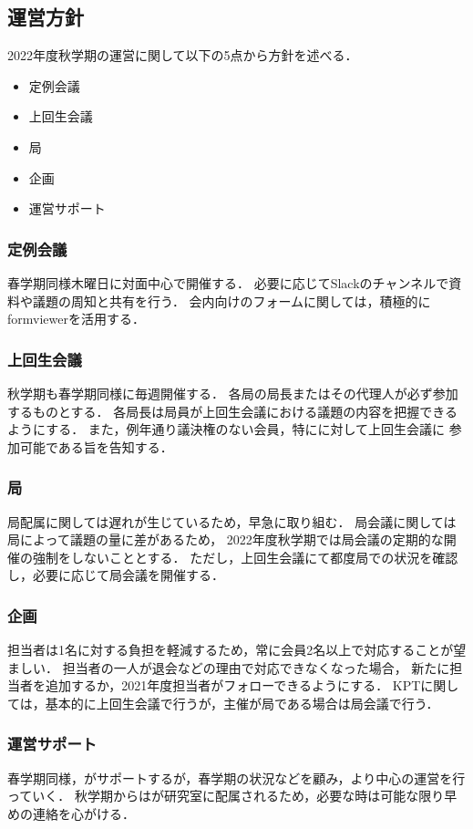 \subsection*{運営方針}


2022年度秋学期の運営に関して以下の5点から方針を述べる．
\begin{itemize}
    \item 定例会議
    \item 上回生会議
    \item 局
    \item 企画
    \item 運営サポート
\end{itemize}

\subsubsection*{定例会議}
春学期同様木曜日に対面中心で開催する．
必要に応じてSlackのチャンネルで資料や議題の周知と共有を行う．
会内向けのフォームに関しては，積極的にformviewerを活用する．

\subsubsection*{上回生会議}
秋学期も春学期同様に毎週開催する．
各局の局長またはその代理人が必ず参加するものとする．
各局長は局員が上回生会議における議題の内容を把握できるようにする．
また，例年通り議決権のない会員，特に\firstGrade{}に対して上回生会議に
参加可能である旨を告知する．

\subsubsection*{局}
局配属に関しては遅れが生じているため，早急に取り組む．
局会議に関しては局によって議題の量に差があるため，
2022年度秋学期では局会議の定期的な開催の強制をしないこととする．
ただし，上回生会議にて都度局での状況を確認し，必要に応じて局会議を開催する．

\subsubsection*{企画}
担当者は1名に対する負担を軽減するため，常に会員2名以上で対応することが望ましい．
担当者の一人が退会などの理由で対応できなくなった場合，
新たに担当者を追加するか，2021年度担当者がフォローできるようにする．
KPTに関しては，基本的に上回生会議で行うが，主催が局である場合は局会議で行う．

\subsubsection*{運営サポート}
春学期同様，\thirdGrade{}がサポートするが，春学期の状況などを顧み，より\secondGrade{}中心の運営を行っていく．
秋学期からは\thirdGrade{}が研究室に配属されるため，必要な時は可能な限り早めの連絡を心がける．
